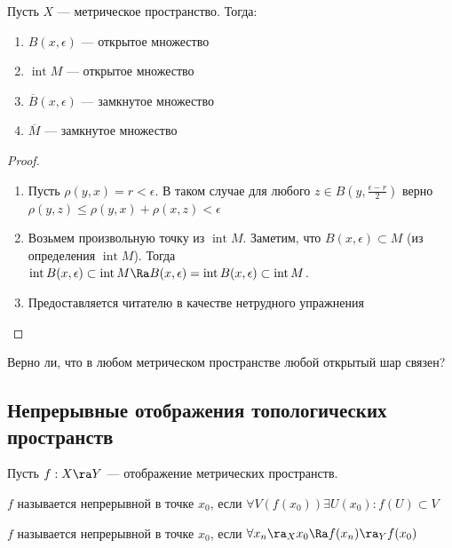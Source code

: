 
\begin{theorem}
    Пусть \(X\) --- метрическое пространство. Тогда:
    \begin{enumerate}
        \item \(B(x, \epsilon)\) --- открытое множество
        \item \(\operatorname{int}M\) --- открытое множество
        \item \(\overline{B}(x, \epsilon)\) --- замкнутое множество
        \item \(\overline{M}\) --- замкнутое множество
    \end{enumerate}
\end{theorem}
\begin{proof}
    \begin{enumerate}
        \item Пусть \(\rho(y, x) = r < \epsilon\). В таком случае для любого \(z \in B\left( y, \frac{\epsilon - r}{2} \right)\) верно \(\rho(y, z) \le \rho(y, x) + \rho(x, z) < \epsilon\)
        \item Возьмем произвольную точку из \(\operatorname{int}M\). Заметим, что \(B(x, \epsilon) \subset M\) (из определения \(\operatorname{int}M\)). Тогда \(\operatorname{int}B(x, \epsilon) \subset \operatorname{int}M \Ra B(x, \epsilon) = \operatorname{int}B(x, \epsilon) \subset \operatorname{int}M\).
        \item[3, 4.] Предоставляется читателю в качестве нетрудного упражнения
    \end{enumerate}
\end{proof}

\begin{exercise}
    Верно ли, что в любом метрическом пространстве любой открытый шар связен?
\end{exercise}

\subsection{Непрерывные отображения топологических пространств}
Пусть \(f: X \ra Y\) --- отображение метрических пространств.
\begin{definition}
    \(f\) называется непрерывной в точке \(x_0\), если \(\forall V(f(x_0)) \exists U(x_0): f(U) \subset V\)
\end{definition}

\begin{definition}
    \(f\) называется непрерывной в точке \(x_0\), если \(\forall x_n \ra_X x_0 \Ra f(x_n) \ra_Y f(x_0)\)
\end{definition}

